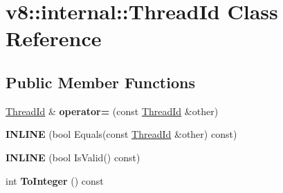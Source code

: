 \hypertarget{classv8_1_1internal_1_1_thread_id}{}\section{v8\+:\+:internal\+:\+:Thread\+Id Class Reference}
\label{classv8_1_1internal_1_1_thread_id}
\subsection*{Public Member Functions}
\begin{DoxyCompactItemize}
\item 
\hyperlink{classv8_1_1internal_1_1_thread_id}{Thread\+Id} \& {\bfseries operator=} (const \hyperlink{classv8_1_1internal_1_1_thread_id}{Thread\+Id} \&other)\hypertarget{classv8_1_1internal_1_1_thread_id_ac20b0254b1e4dba24c11381a3a370475}{}\label{classv8_1_1internal_1_1_thread_id_ac20b0254b1e4dba24c11381a3a370475}

\item 
{\bfseries I\+N\+L\+I\+NE} (bool Equals(const \hyperlink{classv8_1_1internal_1_1_thread_id}{Thread\+Id} \&other) const)\hypertarget{classv8_1_1internal_1_1_thread_id_afd9cfcfc351b61c95cfd251b476c0682}{}\label{classv8_1_1internal_1_1_thread_id_afd9cfcfc351b61c95cfd251b476c0682}

\item 
{\bfseries I\+N\+L\+I\+NE} (bool Is\+Valid() const)\hypertarget{classv8_1_1internal_1_1_thread_id_a4bcdc5b6f92d522a2754527f96ea7dcd}{}\label{classv8_1_1internal_1_1_thread_id_a4bcdc5b6f92d522a2754527f96ea7dcd}

\item 
int {\bfseries To\+Integer} () const \hypertarget{classv8_1_1internal_1_1_thread_id_a4778892ff0453efb9af33bf2f74c6447}{}\label{classv8_1_1internal_1_1_thread_id_a4778892ff0453efb9af33bf2f74c6447}

\end{DoxyCompactItemize}
